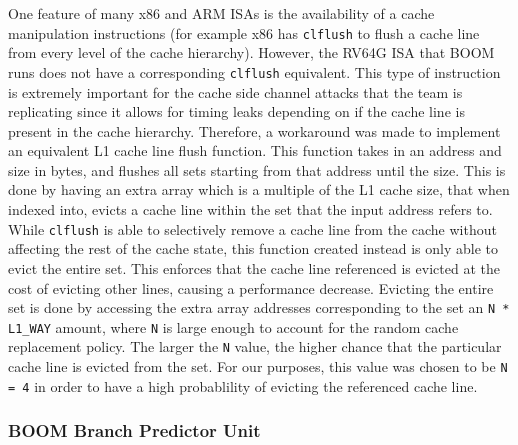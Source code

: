 One feature of many x86 and ARM ISAs is the availability of a cache manipulation instructions
(for example x86 has {\tt clflush} to flush a cache line from every level of the cache hierarchy).
However, the RV64G ISA that BOOM runs does not have a corresponding {\tt clflush} equivalent.
This type of instruction is extremely important for the cache side channel attacks that the team is
replicating since it allows for timing leaks depending on if the cache line is
present in the cache hierarchy. Therefore, a workaround was made to implement an equivalent
L1 cache line flush function. This function takes in an address and size in bytes, and flushes
all sets starting from that address until the size. This is done by having an extra array which 
is a multiple of the L1 cache size, that when indexed into, evicts a cache line within the set that the input
address refers to. While {\tt clflush} is able to selectively remove a cache line from the cache without 
affecting the rest of the cache state, this function created instead is only able to evict the entire set.
This enforces that the cache line referenced is evicted at the cost of evicting other lines, causing a performance
decrease. Evicting the entire set is done by accessing the extra array addresses corresponding to the set an 
{\tt N * L1\_WAY} amount, where {\tt N} is large enough to account for the random cache replacement policy. The larger
the {\tt N} value, the higher chance that the particular cache line is evicted from the set. For our purposes, this value
was chosen to be {\tt N = 4} in order to have a high probablility of evicting the referenced cache line.

\subsubsection{BOOM Branch Predictor Unit}


